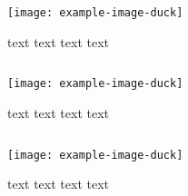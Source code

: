 \documentclass{beamer}
\begin{document}
\begin{frame}
    \begin{figure}
        \begin{columns}
            \begin{column}{.7\textwidth}
                \texttt{[image: example-image-duck]}
            \end{column}
            \begin{column}{.25\textwidth}
                \caption{text text text text}
            \end{column}
        \end{columns}
    \end{figure}
\end{frame}

\begin{frame}
    \begin{figure}
        \begin{columns}[T]
            \begin{column}{.7\textwidth}
                \texttt{[image: example-image-duck]}
            \end{column}
            \begin{column}{.25\textwidth}
                \caption{text text text text}
            \end{column}
        \end{columns}
    \end{figure}
\end{frame}

\begin{frame}
    \begin{figure}
        \begin{columns}[b]
            \begin{column}{.7\textwidth}
                \texttt{[image: example-image-duck]}
            \end{column}
            \begin{column}{.25\textwidth}
                \caption{text text text text}
            \end{column}
        \end{columns}
    \end{figure}
\end{frame}
\end{document}
